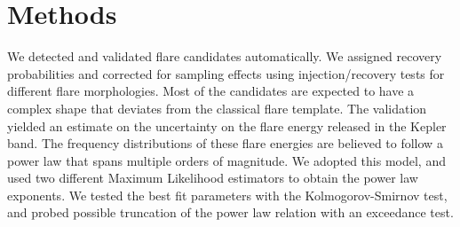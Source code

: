 \documentclass{aa}
\begin{document}
\section{Methods}
We detected and validated flare candidates automatically. We assigned recovery probabilities and corrected for sampling effects using injection/recovery tests for different flare morphologies. Most of the candidates are expected to have a complex shape that deviates from the classical flare template. The validation yielded an estimate on the uncertainty on the flare energy released in the Kepler band. The frequency distributions of these flare energies are believed to follow a power law that spans multiple orders of magnitude. We adopted this model, and used two different Maximum Likelihood estimators to obtain the power law exponents. We tested the best fit parameters with the Kolmogorov-Smirnov test, and probed possible truncation of the power law relation with an exceedance test.
\end{document}
